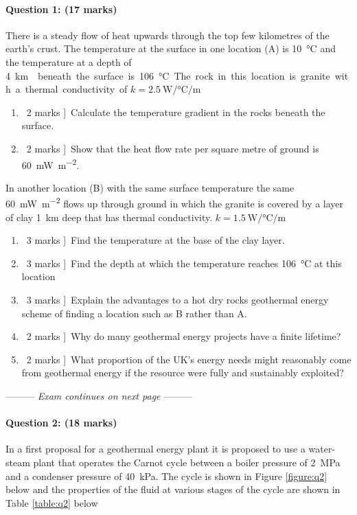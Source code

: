 \documentclass[a4paper,12pt,fleqn]{article}
\newcommand{\middlewords}{Exam continues on next page}
\begin{document}
\bigskip

\paragraph{\textbf{Question 1: (17 marks)}}
There is a steady flow of heat upwards through the top few kilometres of the earth's crust.  The temperature at the surface in one location (A) is \SI{10}{\celsius} and the temperature at a depth of \SI{4}\km{} beneath the surface is \SI{106}{\celsius}. The rock in this location is granite with a thermal conductivity of $k=\SI{2.5}{\watt\per\celsius\per\metre}$
\begin{enumerate}[label=\alph*)]
\item \lbrack\ 2 marks ]\ Calculate the temperature gradient in the rocks beneath the surface.
\item \lbrack\ 2 marks ]\ Show that the heat flow rate per square metre of ground is \SI{60}{\milli\watt\per\metre\squared}.
\end{enumerate}
In another location (B) with the same surface temperature the same \SI{60}{\milli\watt\per\metre\squared} flows up through ground in which the granite is covered by a layer of clay \SI{1}{\kilo\metre} deep that has thermal conductivity.  $k=\SI{1.5}{\watt\per\celsius\per\metre}$
\begin{enumerate}[label=\alph*)]
\item \lbrack\ 3 marks ]\ Find the temperature at the base of the clay layer.
\item \lbrack\ 3 marks ]\ Find the depth at which the temperature reaches \SI{106}{\celsius} at this location
\item \lbrack\ 3 marks ]\ Explain the advantages to a hot dry rocks geothermal energy scheme of finding a location such as B rather than A.
\item \lbrack\ 2 marks ]\ Why do many geothermal energy projects have a finite lifetime?
\item \lbrack\ 2 marks ]\ What proportion of the UK's energy needs might reasonably come from geothermal energy if the resource were fully and sustainably exploited?
\end{enumerate}
\begin{center}
\vspace{3cm}
--------- \textit{\middlewords} ---------
\end{center}

\newpage
\paragraph{\textbf{Question 2: (18 marks)}}
In a first proposal for a geothermal energy plant it is proposed to use a water-steam plant that operates the Carnot cycle between a boiler pressure of \SI{2}{\mega\pascal} and a condenser pressure of \SI{40}{kPa}. The cycle is shown in Figure \ref{figure:q2} below and the properties of the fluid at various stages of the cycle are shown in Table \ref{table:q2} below
\end{document}
